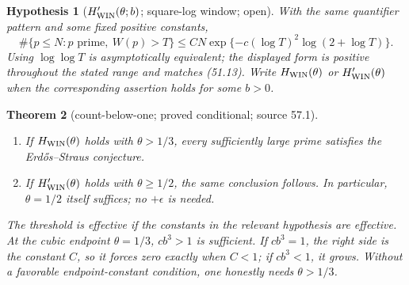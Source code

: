 \documentclass[10pt,reqno]{amsart}
\newtheorem{theorem}{Theorem}[section]
\newtheorem{hypothesis}[theorem]{Hypothesis}
\theoremstyle{definition}
\newcommand{\1}{\mathbf 1}
\begin{document}
\begin{hypothesis}[$H'_{\rm WIN}(\theta;b)$; square-log window; open]
\label{hyp:WIN-square}
With the same quantifier pattern and some fixed positive constants,
\begin{equation}\tag{57.3}
 \#\{p\leq N:p\text{ prime},\ W(p)>T\}
 \leq CN\exp\{-c(\log T)^2\log(2+\log T)\}.
\end{equation}
Using $\log\log T$ is asymptotically equivalent; the displayed form is
positive throughout the stated range and matches (51.13).  Write
$H_{\rm WIN}(\theta)$ or $H'_{\rm WIN}(\theta)$ when the corresponding
assertion holds for some $b>0$.
\end{hypothesis}

\begin{theorem}[count-below-one; proved conditional; source 57.1]
\label{thm:count-below-one}
\begin{enumerate}[leftmargin=*,label=\arabic*.]
\item If $H_{\rm WIN}(\theta)$ holds with $\theta>1/3$, every sufficiently
large prime satisfies the Erd\H{o}s--Straus conjecture.
\item If $H'_{\rm WIN}(\theta)$ holds with $\theta\geq1/2$, the same
conclusion follows.  In particular, $\theta=1/2$ itself suffices; no
$+\epsilon$ is needed.
\end{enumerate}
The threshold is effective if the constants in the relevant hypothesis are
effective.  At the cubic endpoint $\theta=1/3$, $cb^3>1$ is sufficient.
If $cb^3=1$, the right side is the constant $C$, so it forces zero exactly
when $C<1$; if $cb^3<1$, it grows.  Without a favorable endpoint-constant
condition, one honestly needs $\theta>1/3$.
\end{theorem}
\end{document}
